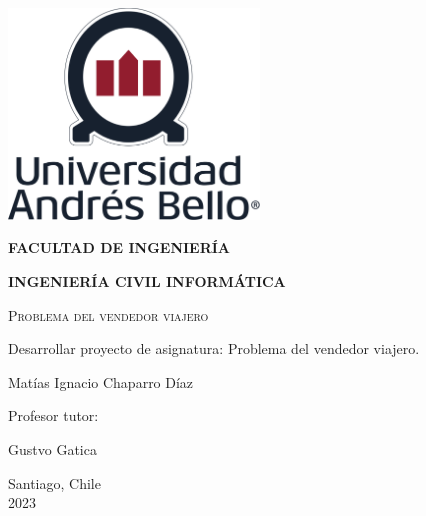 \begin{titlepage}
    \centering
    {\includegraphics[width=0.5\textwidth]{imgs/unabLogos/unabFrontPageLogo.png}\par}
    \vspace{1cm}
    {\textbf{FACULTAD DE INGENIERÍA}\par}
    {\textbf{INGENIERÍA CIVIL INFORMÁTICA} \par}
    \vspace{1cm}
    {\scshape\Huge Problema del vendedor viajero\par}
    \vspace{2cm}
    {\LARGE Desarrollar proyecto de asignatura: Problema del vendedor viajero.\par}
    \vfill    
    {\Large Matías Ignacio Chaparro Díaz \par}    
    \vfill
    {\Large Profesor tutor: \par}
    {\Large Gustvo Gatica\par}
    \vspace{1cm}
    \vfill
    {\Large Santiago, Chile \\ 2023 \par}
\end{titlepage}
 